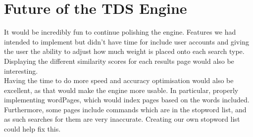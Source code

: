 \section{Future of the TDS Engine}
It would be incredibly fun to continue polishing the engine. Features we had intended to implement but didn't have time for include user accounts and giving the user the ability to adjust how much weight is placed onto each search type. Displaying the different similarity scores for each results page would also be interesting. \\
Having the time to do more speed and accuracy optimisation would also be excellent, as that would make the engine more usable. In particular, properly implementing wordPages, which would index pages based on the words included.  Furthermore, some pages include commands which are in the stopword list, and as such searches for them are very inaccurate. Creating our own stopword list could help fix this.
